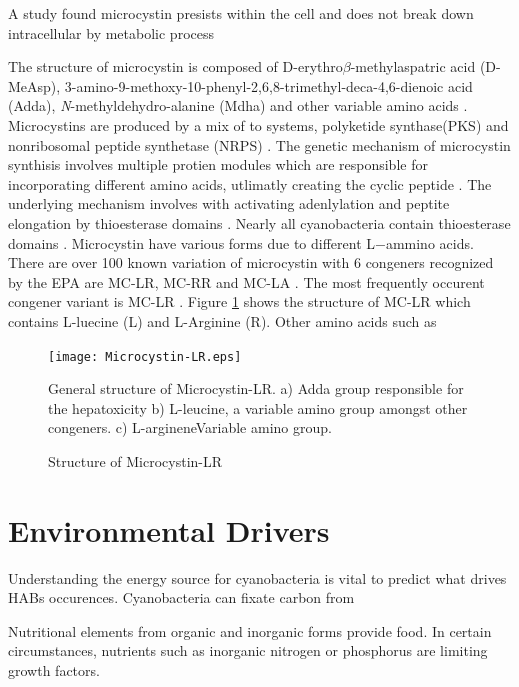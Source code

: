 \documentclass{ou-thesis}
\begin{document}
A study found microcystin presists within the cell and does not break down intracellular by metabolic process \cite{rohrlack_fate_2007}




The structure of microcystin is composed of D-erythro$\beta$-methylaspatric acid (D-MeAsp), 3-amino-9-methoxy-10-phenyl-2,6,8-trimethyl-deca-4,6-dienoic acid (Adda), \textit{N}-methyldehydro-alanine (Mdha) and other variable amino acids \cite{nishizawa_genetic_1999}.
Microcystins are produced by a mix of to systems, polyketide synthase(PKS) and nonribosomal peptide synthetase (NRPS) \cite{tillett_structural_2000}.
The genetic mechanism of microcystin synthisis involves multiple protien modules which are responsible for incorporating different amino acids, utlimatly creating the cyclic peptide \cite{nishizawa_genetic_1999}. The underlying mechanism involves with activating adenlylation and peptite elongation by thioesterase domains \cite{welker_cyanobacterial_2006}.
Nearly all cyanobacteria contain thioesterase domains \cite{tonk_production_2009}. Microcystin have various forms due to different L$-$ammino acids.
There are over 100 known variation of microcystin with 6 congeners recognized by the EPA are MC-LR, MC-RR and MC-LA \cite{puddick_modulation_2016}. The most frequently occurent congener variant is MC-LR \cite{rastogi_cyanotoxin-microcystins:_2014}. Figure \ref{structure1} shows the structure of MC-LR which contains L-luecine (L) and L-Arginine (R). Other amino acids such as


\begin{figure}[t]
  \texttt{[image: Microcystin-LR.eps]}
  \caption{Structure of Microcystin-LR}
  General structure of Microcystin-LR. a) Adda group responsible for the hepatoxicity
  b) L-leucine, a variable amino group amongst other congeners.
  c) L-argineneVariable amino group.
  \label{structure1}
\end{figure}


\section{Environmental Drivers}

Understanding the energy source for cyanobacteria is vital to predict what drives HABs occurences. Cyanobacteria can fixate carbon from 

Nutritional elements from organic and inorganic forms provide food. In certain circumstances, nutrients such as inorganic nitrogen or phosphorus are limiting growth factors.
\end{document}
